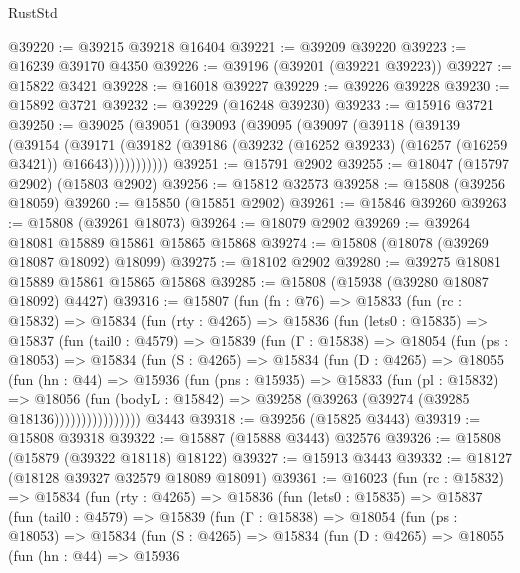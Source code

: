 \begin{lexlean}{RustStd}
\begin{coremodule}
@39220 := @39215 @39218 @16404
@39221 := @39209 @39220
@39223 := @16239 @39170 @4350
@39226 := @39196 (@39201 (@39221 @39223))
@39227 := @15822 @3421
@39228 := @16018 @39227
@39229 := @39226 @39228
@39230 := @15892 @3721
@39232 := @39229 (@16248 @39230)
@39233 := @15916 @3721
@39250 := @39025
    (@39051
      (@39093
        (@39095
          (@39097
            (@39118
              (@39139
                (@39154
                  (@39171
                    (@39182
                      (@39186 (@39232 (@16252 @39233) (@16257 (@16259 @3421)) @16643)))))))))))
@39251 := @15791 @2902
@39255 := @18047 (@15797 @2902) (@15803 @2902)
@39256 := @15812 @32573
@39258 := @15808 (@39256 @18059)
@39260 := @15850 (@15851 @2902)
@39261 := @15846 @39260
@39263 := @15808 (@39261 @18073)
@39264 := @18079 @2902
@39269 := @39264 @18081 @15889 @15861 @15865 @15868
@39274 := @15808 (@18078 (@39269 @18087 @18092) @18099)
@39275 := @18102 @2902
@39280 := @39275 @18081 @15889 @15861 @15865 @15868
@39285 := @15808 (@15938 (@39280 @18087 @18092) @4427)
@39316 := @15807
    (fun (fn : @76) =>
    @15833
      (fun (rc : @15832) =>
      @15834
        (fun (rty : @4265) =>
        @15836
          (fun (lets0 : @15835) =>
          @15837
            (fun (tail0 : @4579) =>
            @15839
              (fun (Γ : @15838) =>
              @18054
                (fun (ps : @18053) =>
                @15834
                  (fun (S : @4265) =>
                  @15834
                    (fun (D : @4265) =>
                    @18055
                      (fun (hn : @44) =>
                      @15936
                        (fun (pns : @15935) =>
                        @15833
                          (fun (pl : @15832) =>
                          @18056
                            (fun (bodyL : @15842) =>
                            @39258 (@39263 (@39274 (@39285 @18136))))))))))))))))
    @3443
@39318 := @39256 (@15825 @3443)
@39319 := @15808 @39318
@39322 := @15887 (@15888 @3443) @32576
@39326 := @15808 (@15879 (@39322 @18118) @18122)
@39327 := @15913 @3443
@39332 := @18127 (@18128 @39327 @32579 @18089 @18091)
@39361 := @16023
    (fun (rc : @15832) =>
    @15834
      (fun (rty : @4265) =>
      @15836
        (fun (lets0 : @15835) =>
        @15837
          (fun (tail0 : @4579) =>
          @15839
            (fun (Γ : @15838) =>
            @18054
              (fun (ps : @18053) =>
              @15834
                (fun (S : @4265) =>
                @15834
                  (fun (D : @4265) =>
                  @18055
                    (fun (hn : @44) =>
                    @15936

\end{coremodule}
\end{lexlean}
